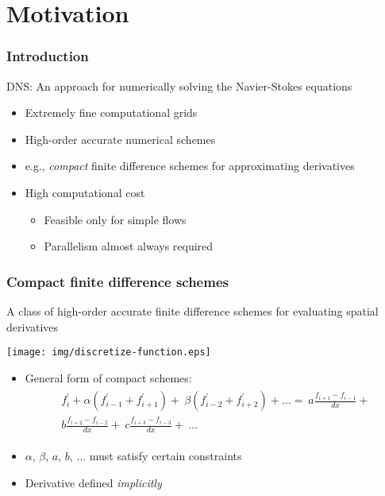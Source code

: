 
\section{Motivation}

\begin{frame}
\frametitle{Introduction}
DNS: An approach for numerically solving
the Navier-Stokes equations
\begin{itemize}
\item Extremely fine computational grids
\item High-order accurate numerical schemes
\item e.g., \emph{compact} finite
    difference schemes for approximating derivatives
\item High computational cost
    \begin{itemize}
    \item Feasible only for simple flows
    \item Parallelism almost always required
    \end{itemize}
\end{itemize}
\end{frame}

\begin{frame}
\frametitle{Compact finite difference schemes}
A class of high-order accurate finite difference schemes
for evaluating spatial derivatives

\centering
\texttt{[image: img/discretize-function.eps]}

\begin{itemize}
\item {General form of compact schemes:
\begin{align*}
\begin{split}
f_i^{\prime} + \alpha(f^{\prime}_{i-1} + f^{\prime}_{i+1}) + \
\beta(f^{\prime}_{i-2} + f^{\prime}_{i+2}) + \hdots  = \
a\frac{f_{i+1} - f_{i-1}}{dx} + \\
b\frac{f_{i+2} - f_{i-2}}{dx} + \
c\frac{f_{i+3} - f_{i-3}}{dx} + \
    \hdots
\end{split}
\end{align*}}
\item $\alpha$, $\beta$, $a$, $b$, $\hdots$ must
    satisfy certain constraints
\item Derivative defined \emph{implicitly}
\end{itemize}
\end{frame}

